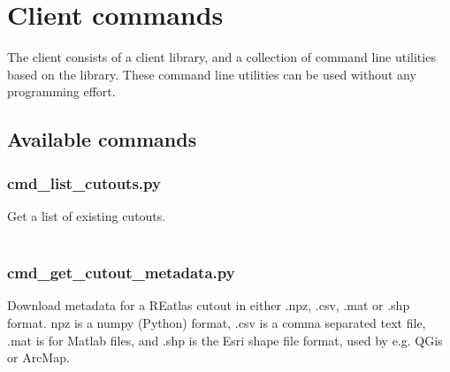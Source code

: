 \documentclass[a4paper,10pt]{article}
\begin{document}
\section{Client commands}

The client consists of a client library, and a collection of command line
utilities based on the library. These command line utilities can be
used without any programming effort.



\subsection{Available commands}

\subsubsection{cmd\_list\_cutouts.py} Get a list of existing cutouts.
\ \\ \ \\ \cprotect{}
\subsubsection{cmd\_get\_cutout\_metadata.py} Download metadata for a REatlas cutout in either .npz, .csv, .mat or .shp format. npz is a numpy (Python) format, .csv is a comma separated text file, .mat is for Matlab files, and .shp is the Esri shape file format, used by e.g. QGis or ArcMap.
\ \\ \ \\ \cprotect{}
\end{document}
